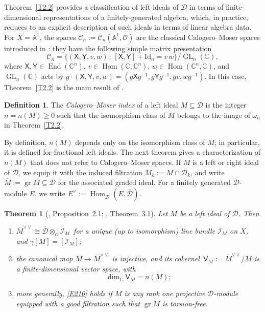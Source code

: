 \documentclass[11pt,reqno]{amsart}
\theoremstyle{plain}
\newtheorem{theorem}{Theorem}[section]
\theoremstyle{definition}
\newtheorem{definition}{Definition}
\theoremstyle{remark}
\numberwithin{equation}{section}
\newcommand{\cD}{\mathcal{D}}
\newcommand{\cO}{\mathcal{O}}
\newcommand{\cC}{\mathcal{C}}
\newcommand{\C}{\mathbb{C}}
\newcommand{\A}{\mathbb{A}}
\newcommand{\bD}{\overline{\cD}}
\newcommand{\bM}{\overline{M}}
\DeclareMathOperator{\Hom}{Hom}
\DeclareMathOperator{\End}{End}
\DeclareMathOperator{\GL}{GL}
\DeclareMathOperator{\gr}{gr}
\begin{document}
%
Theorem~\ref{T2.2} provides a classification of left ideals of $\cD $ in terms of finite-dimensional representations of a finitely-generated algebra, which, in practice, reduces
to an explicit description of such ideals in terms of linear algebra data.
For $X = \A^1$, the spaces $\cC_n := \cC_n(\A^1, \cO)$ are the classical Calogero--Moser spaces 
introduced in \cite{Wilson1998}: they have the following simple matrix presentation
\begin{equation}
\label{E29}
  \cC_n = \{ (\mathsf{X}, \mathsf{Y}, v, w) \, : \, [\mathsf{X}, \mathsf{Y}] + \mathrm{Id}_n = v\,w
  \} / \GL_n(\C) ,
\end{equation}
where $\mathsf{X}, \mathsf{Y} \in \End(\C^n)$, $v \in \Hom(\C, \C^n)$, $w \in \Hom(\C^n, \C)$, and
$\GL_n(\C)$ acts by $g \cdot (\mathsf{X}, \mathsf{Y}, v, w) = (g \mathsf{X} g^{-1}, g \mathsf{Y}
g^{-1}, g v, w g^{-1})$. In this case, Theorem~\ref{T2.2} is the main result of
\cite{BerestWilson00, BerestWilsonNC}.

\begin{definition}
\label{DCM}
The \emph{Calogero--Moser index} of a left ideal $M \subseteq \cD$ is the integer $n = n(M) \ge 0$
such that the isomorphism class of $M$ belongs to the image of $\omega_n$ in Theorem~\ref{T2.2}.
\end{definition}

By definition, $n(M)$ depends only on the isomorphism class of $M$; in particular, it is defined
for fractional left ideals. The next theorem gives a characterization of $n(M)$ that does not
refer to Calogero--Moser spaces. If $M$ is a left or right ideal of $\cD$, we equip it with the
induced filtration $M_k := M \cap \cD_k$, and write $\bM := \gr M \subseteq \bD$ for the associated
graded ideal. For a finitely generated $\bD$-module $E$, we write
$E^\vee := \Hom_{\bD}(E, \bD)$.

\begin{theorem}[\cite{BerestWilson09}, Proposition~2.1; \cite{BerestChalykhIdeals}, Theorem~3.1]
\label{T2.3}
Let $M$ be a left ideal of $\cD$. Then
\begin{enumerate}
\item[$(a)$] $\bM^{\vee\vee} \cong \bD \otimes_{\cO} \mathcal{I}_M\,$ for a unique (up to
isomorphism) line bundle $\mathcal{I}_M$ on $X$, and $\gamma[M] = [\mathcal{I}_M]$;
\item[$(b)$] the canonical map $\bM \to \bM^{\vee\vee}$ is injective, and its cokernel
$\,\mathsf{V}_M := \bM^{\vee\vee}/\bM$ is a finite-dimensional vector space, with
\begin{equation}
\label{E210}
  \dim_{\C} \mathsf{V}_M = n(M) ;
\end{equation}
\item[$(c)$] more generally, \eqref{E210} holds if $M$ is any rank one projective $\cD$-module
equipped with a good filtration such that $\gr M$ is torsion-free.
\end{enumerate}
\end{theorem}
\end{document}
